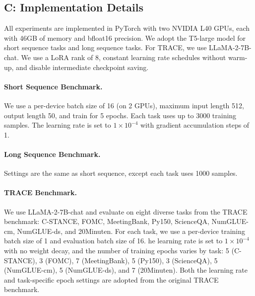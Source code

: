 \documentclass[letterpaper]{article} %
\begin{document}
\subsection{C: Implementation Details}


All experiments are implemented in PyTorch with two NVIDIA L40 GPUs, each with 46GB of memory  and bfloat16 precision. We adopt the T5-large model for short sequence tasks and long sequence tasks. For TRACE, we use LLaMA-2-7B-chat. We use a LoRA rank of 8, constant learning rate schedules without warm-up, and disable intermediate checkpoint saving.

\paragraph{Short Sequence Benchmark.} We use a per-device batch size of 16 (on 2 GPUs), maximum input length 512, output length 50, and train for 5 epochs. Each task uses up to 3000 training samples. The learning rate is set to $1\times10^{-4}$ with gradient accumulation steps of 1.

\paragraph{Long Sequence Benchmark.} Settings are the same as short sequence, except each task uses 1000 samples.

\paragraph{TRACE Benchmark.} We use LLaMA-2-7B-chat and evaluate on eight diverse tasks from the TRACE benchmark: {C-STANCE}, {FOMC}, {MeetingBank}, {Py150}, {ScienceQA}, {NumGLUE-cm}, {NumGLUE-ds}, and {20Minuten}. For each task, we use a per-device training batch size of 1 and evaluation batch size of 16.  he learning rate is set to $1\times10^{-4}$ with no weight decay, and the number of training epochs varies by task: 5 (C-STANCE), 3 (FOMC), 7 (MeetingBank), 5 (Py150), 3 (ScienceQA), 5 (NumGLUE-cm), 5 (NumGLUE-ds), and 7 (20Minuten). Both the learning rate and task-specific epoch settings are adopted from the original TRACE benchmark\cite{wang2023tracecomprehensivebenchmarkcontinual}.




\end{document}
